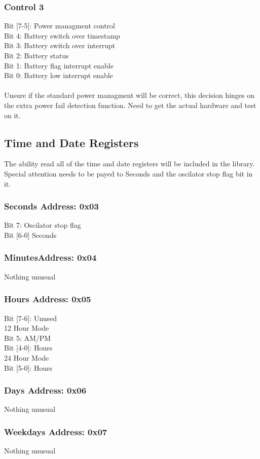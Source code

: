 \documentclass[letterpaper,11pt]{article}
\newcommand{\address}[1]
{\textbf{Address: 0x#1}}
\begin{document}
		\subsubsection{Control 3}
			Bit [7-5]: Power managment control\\
			Bit 4: Battery switch over timestamp\\
			Bit 3: Battery switch over interrupt\\
			Bit 2: Battery status\\
			Bit 1: Battery flag interrupt enable\\
			Bit 0: Battery low interrupt enable\\
			\\
			Unsure if the standard power managment will be correct, this decision hinges on the extra power fail detection function. Need to get the actual hardware and test on it.
	\subsection{Time and Date Registers}
		The ability read all of the time and date registers will be included in the library. Special attention needs to be payed to Seconds and the oscilator stop flag bit in it.\\
		\subsubsection{Seconds \address{03}}
			Bit 7: Oscilator stop flag\\
			Bit [6-0] Seconds\\
		\subsubsection{Minutes\address{04}}
			Nothing unusual
		\subsubsection{Hours \address{05}}
			Bit [7-6]: Unused\\
			12 Hour Mode\\
			Bit 5: AM/PM\\
			Bit [4-0]: Hours\\
			24 Hour Mode\\
			Bit [5-0]: Hours
		\subsubsection{Days \address{06}}
			Nothing unusual
		\subsubsection{Weekdays \address{07}}
			Nothing unusual
\end{document}

